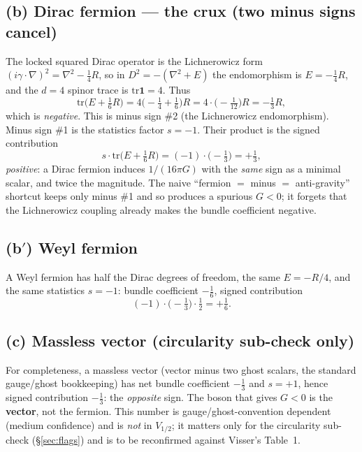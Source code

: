 \documentclass[11pt]{article}
\newcommand{\tr}{\mathrm{tr}}
\begin{document}
\subsection*{(b) Dirac fermion --- the crux (two minus signs cancel)}
The locked squared Dirac operator is the Lichnerowicz form
$(i\gamma\!\cdot\!\nabla)^2=\nabla^2-\tfrac14 R$, so in $D^2=-(\nabla^2+E)$ the
endomorphism is $E=-\tfrac14 R$, and the $d=4$ spinor trace is $\tr\mathbf{1}=4$. Thus
\begin{equation}\label{eq:dirac-bundle}
\tr\!\big(E+\tfrac16 R\big)=4\big(-\tfrac14+\tfrac16\big)R
   =4\cdot\big(-\tfrac{1}{12}\big)R=-\tfrac13 R,
\end{equation}
which is \emph{negative}. This is minus sign \#2 (the Lichnerowicz endomorphism). Minus
sign \#1 is the statistics factor $s=-1$. Their product is the signed contribution
\begin{equation}\label{eq:dirac-signed}
s\cdot\tr\!\big(E+\tfrac16 R\big)=(-1)\cdot\big(-\tfrac13\big)=+\tfrac13,
\end{equation}
\emph{positive}: a Dirac fermion induces $1/(16\pi G)$ with the \emph{same} sign as a
minimal scalar, and twice the magnitude. The naive ``fermion $=$ minus $=$ anti-gravity''
shortcut keeps only minus \#1 and so produces a spurious $G<0$; it forgets that the
Lichnerowicz coupling already makes the bundle coefficient negative.

\subsection*{(b$'$) Weyl fermion}
A Weyl fermion has half the Dirac degrees of freedom, the same $E=-R/4$, and the same
statistics $s=-1$: bundle coefficient $-\tfrac16$, signed contribution
\begin{equation}\label{eq:weyl}
(-1)\cdot\big(-\tfrac13\big)\cdot\tfrac12=+\tfrac16.
\end{equation}

\subsection*{(c) Massless vector (circularity sub-check only)}
For completeness, a massless vector (vector minus two ghost scalars, the standard
gauge/ghost bookkeeping) has net bundle coefficient $-\tfrac13$ and $s=+1$, hence signed
contribution $-\tfrac13$: the \emph{opposite} sign. The boson that gives $G<0$ is the
\textbf{vector}, not the fermion. This number is gauge/ghost-convention dependent
(medium confidence) and is \emph{not} in $V_{1/2}$; it matters only for the circularity
sub-check (\S\ref{sec:flags}) and is to be reconfirmed against Visser's Table~1.
\end{document}
